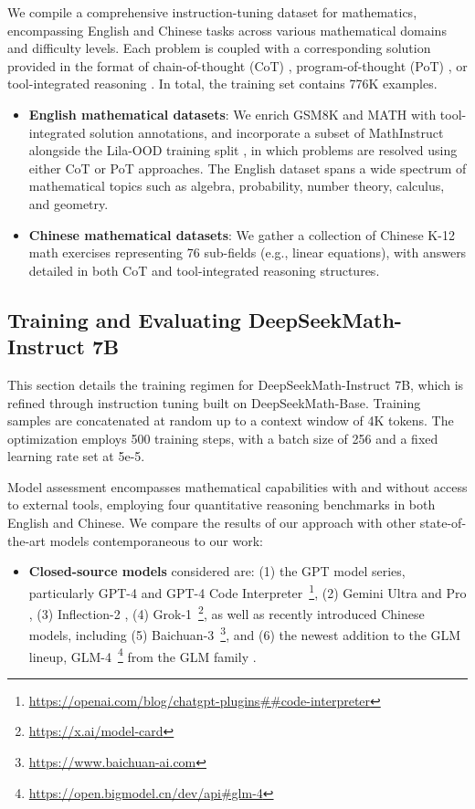 We compile a comprehensive instruction-tuning dataset for mathematics, encompassing English and Chinese tasks across various mathematical domains and difficulty levels. Each problem is coupled with a corresponding solution provided in the format of chain-of-thought (CoT) \citep{cot}, program-of-thought (PoT) \citep{pot,pal}, or tool-integrated reasoning \citep{tora}. In total, the training set contains 776K examples.

\begin{itemize}[topsep=0pt]
    \item \textbf{English mathematical datasets}: We enrich GSM8K and MATH with tool-integrated solution annotations, and incorporate a subset of MathInstruct \citep{MathInstruct} alongside the Lila-OOD training split \citep{lila}, in which problems are resolved using either CoT or PoT approaches. The English dataset spans a wide spectrum of mathematical topics such as algebra, probability, number theory, calculus, and geometry.
    \item \textbf{Chinese mathematical datasets}: We gather a collection of Chinese K-12 math exercises representing 76 sub-fields (e.g., linear equations), with answers detailed in both CoT and tool-integrated reasoning structures.
\end{itemize}

\subsection{Training and Evaluating DeepSeekMath-Instruct 7B}

This section details the training regimen for DeepSeekMath-Instruct 7B, which is refined through instruction tuning built on DeepSeekMath-Base. Training samples are concatenated at random up to a context window of 4K tokens. The optimization employs 500 training steps, with a batch size of 256 and a fixed learning rate set at 5e-5.

Model assessment encompasses mathematical capabilities with and without access to external tools, employing four quantitative reasoning benchmarks in both English and Chinese. We compare the results of our approach with other state-of-the-art models contemporaneous to our work:

\begin{itemize}[topsep=0pt]
    \item \textbf{Closed-source models} considered are: (1) the GPT model series, particularly GPT-4 \citep{gpt4} and GPT-4 Code Interpreter~\footnote{\url{https://openai.com/blog/chatgpt-plugins\#\#code-interpreter}}, (2) Gemini Ultra and Pro \citep{gemini}, (3) Inflection-2 \citep{inflection-2}, (4) Grok-1~\footnote{\url{https://x.ai/model-card}}, as well as recently introduced Chinese models, including (5) Baichuan-3~\footnote{\url{https://www.baichuan-ai.com}}, and (6) the newest addition to the GLM lineup, GLM-4~\footnote{\url{https://open.bigmodel.cn/dev/api\#glm-4}} from the GLM family \citep{glm}.
\end{itemize}

